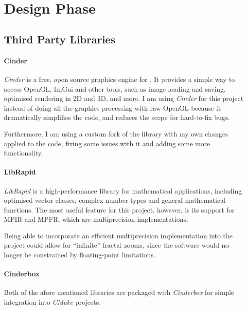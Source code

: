 \section{Design Phase} \label{designPhase}

\subsection{Third Party Libraries}

\begin{multicols}{2}
	\paragraph{Cinder \cite{developers_davis}} \textit{Cinder} is a free, open source graphics engine for \CC. It provides a simple way to access OpenGL, ImGui and other tools, such as image loading and saving, optimised rendering in 2D and 3D, and more. I am using \textit{Cinder} for this project instead of doing all the graphics processing with raw OpenGL because it dramatically simplifies the code, and reduces the scope for hard-to-fix bugs.
	
	Furthermore, I am using a custom fork of the library with my own changes applied to the code, fixing some issues with it and adding some more functionality.
	
	\paragraph{LibRapid \cite{Davis_LibRapid_Optimised_Mathematics_2023}} \textit{LibRapid} is a high-performance library for mathematical applications, including optimised vector classes, complex number types and general mathematical functions. The most useful feature for this project, however, is its support for MPIR and MPFR, which are multiprecision implementations.
	
	Being able to incorporate an efficient multiprecision implementation into the project could allow for ``infinite'' fractal zooms, since the software would no longer be constrained by floating-point limitations.
	
	\paragraph{Cinderbox} Both of the afore mentioned libraries are packaged with \textit{Cinderbox} for simple integration into \textit{CMake} projects.
\end{multicols}

